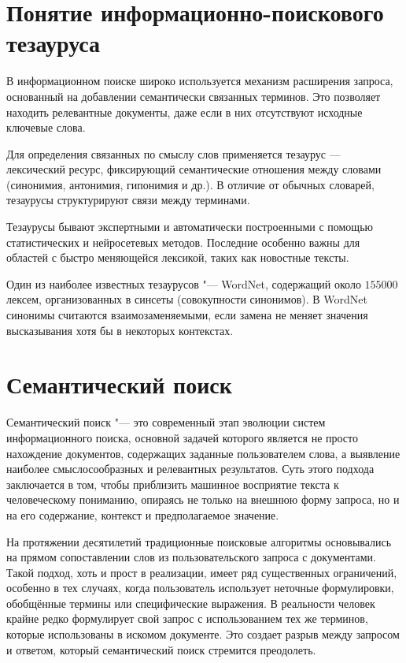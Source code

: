 \documentclass[coursework]{SCWorks}
\begin{document}


\section{Понятие информационно-поискового тезауруса}
В информационном поиске широко используется механизм расширения запроса, основанный на добавлении семантически связанных терминов. Это позволяет находить релевантные документы, даже если в них отсутствуют исходные ключевые слова.

Для определения связанных по смыслу слов применяется тезаурус — лексический ресурс, фиксирующий семантические отношения между словами (синонимия, антонимия, гипонимия и др.). В отличие от обычных словарей, тезаурусы структурируют связи между терминами.

Тезаурусы бывают экспертными и автоматически построенными с помощью статистических и нейросетевых методов. Последние особенно важны для областей с быстро меняющейся лексикой, таких как новостные тексты.

Один из наиболее известных тезаурусов "--- WordNet, содержащий около $155000$ лексем, организованных в синсеты (совокупности синонимов). В WordNet синонимы считаются взаимозаменяемыми, если замена не меняет значения высказывания хотя бы в некоторых контекстах.


\section{Семантический поиск}
Семантический поиск "--- это современный этап эволюции систем информационного поиска, основной задачей которого является не просто нахождение документов, содержащих заданные пользователем слова, а выявление наиболее смыслосообразных и релевантных результатов. Суть этого подхода заключается в том, чтобы приблизить машинное восприятие текста к человеческому пониманию, опираясь не только на внешнюю форму запроса, но и на его содержание, контекст и предполагаемое значение.

На протяжении десятилетий традиционные поисковые алгоритмы основывались на прямом сопоставлении слов из пользовательского запроса с документами. Такой подход, хоть и прост в реализации, имеет ряд существенных ограничений, особенно в тех случаях, когда пользователь использует неточные формулировки, обобщённые термины или специфические выражения. В реальности человек крайне редко формулирует свой запрос с использованием тех же терминов, которые использованы в искомом документе. Это создает разрыв между запросом и ответом, который семантический поиск стремится преодолеть.
\end{document}
